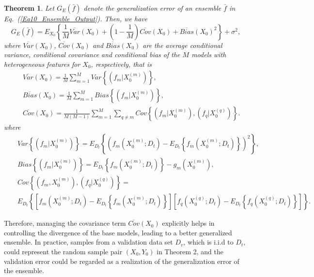 \documentclass{article}
\newtheorem{theorem}{Theorem}
\begin{document}
\begin{theorem} Let $G_E(\bar{f})$ denote the generalization error of an ensemble $\bar{f}$ in Eq.~(\ref{Eq10_Ensemble_Output}). 
Then, we have
\label{TH02}
\begin{equation}
\label{Eq08_Ensemble_ThreeParts}
G_E(\bar{f}) = E_{X_0}  \left\lbrace \frac{1}{M} \overline{Var}(X_0) + (1 - \frac{1}{M})\overline{Cov}(X_0) + \overline{Bias}(X_0)^2 \right\rbrace + \sigma^2,  
\end{equation}
where $\overline{Var}(X_0)$, $\overline{Cov}(X_0)$ and $\overline{Bias}(X_0)$ are the average conditional variance, conditional covariance and conditional bias of the $M$ models with heterogeneous features for $X_0$, respectively, that is 
\begin{eqnarray}
&& \overline{Var}(X_0)   = \frac{1}{M}\sum_{m=1}^M   Var\left\lbrace (f_m | X_0^{(m)}) \right\rbrace,  \label{Eq09_Var}\\ 
&& \overline{Bias}( X_0) = \frac{1}{M} \sum_{m=1}^M  Bias\left\lbrace (f_m | X_0^{(m)}) \right\rbrace, \\
&& \overline{Cov}(X_0)   = \frac{1}{M(M-1)}\sum_{m=1}^M \sum_{q \neq m } Cov\left\lbrace  (f_m |X_0^{(m)}), (f_q|X_0^{(q)})\right\rbrace. \label{Eq10_Cov}
\label{Eq11_Bias}
\end{eqnarray}
where 
\begin{eqnarray*}
&&  Var\left\lbrace (f_m | X_0^{(m)}) \right\rbrace = E_{D_t} \left\lbrace \left( f_m(X_0^{(m)}; D_t) -E_{D_t}\left\lbrace f_m(X_0^{(m)}; D_t)  \right\rbrace \right)^2 \right\rbrace, \\
&&  Bias\left\lbrace (f_m | X_0^{(m)}) \right\rbrace = E_{D_t} \left\lbrace f_m(X_0^{(m)}; D_t) \right\rbrace  - g_m(X_0^{(m)}), \\
&& Cov\left\lbrace  (f_m, X_0^{(m)}), (f_q | X_0^{(q)}) \right\rbrace = \\
&& E_{D_t} \left\lbrace \left[ f_m (X_0^{(m)}; D_t) - E_{D_t} \left\lbrace f_m (X_0^{(m)}; D_t)\right\rbrace \right] \left[ f_q (X_0^{(q)}; D_t) - E_{D_t} \left\lbrace f_q(X_0^{(q)}; D_t)\right\rbrace \right] \right\rbrace. 
\end{eqnarray*}
\end{theorem}

Therefore, managing the covariance term $\overline{Cov}(X_0)$ explicitly helps in controlling the divergence of the base models, leading to a better generalized ensemble.
In practice, samples from a validation data set $D_v$, which is i.i.d to $D_t$,  could represent the random sample pair $(X_0, Y_0)$ in Theorem 2, and the validation error could be regarded as a realization of the generalization error of the ensemble.
\end{document}
